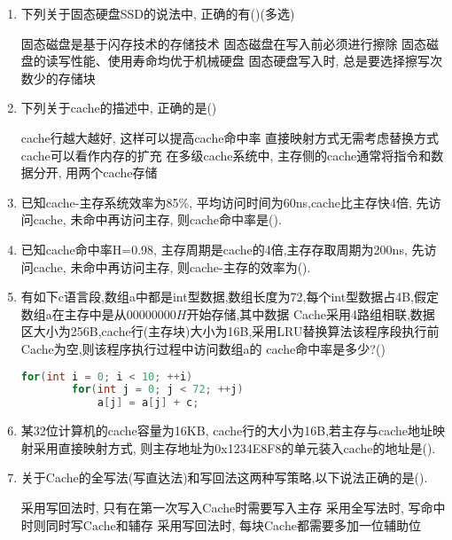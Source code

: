 \documentclass[12pt, a4paper, oneside, UTF8]{ctexbook}
\begin{document}
\begin{enumerate}
    \item 下列关于固态硬盘SSD的说法中, 正确的有(\qquad)(多选)
    \begin{choices}[1]
        \task 固态磁盘是基于闪存技术的存储技术
        \task 固态磁盘在写入前必须进行擦除
        \task 固态磁盘的读写性能、使用寿命均优于机械硬盘
        \task 固态硬盘写入时, 总是要选择擦写次数少的存储块
    \end{choices}

    \item 下列关于cache的描述中, 正确的是(\qquad)
    \begin{choices}[1]
        \task cache行越大越好, 这样可以提高cache命中率
        \task 直接映射方式无需考虑替换方式
        \task cache可以看作内存的扩充
        \task 在多级cache系统中, 主存侧的cache通常将指令和数据分开, 用两个cache存储
    \end{choices}

    \item 已知cache-主存系统效率为85\%, 平均访问时间为60ns,cache比主存快4倍, 先访问cache, 未命中再访问主存,
    则cache命中率是(\qquad).

    \item 已知cache命中率H=0.98, 主存周期是cache的4倍,主存存取周期为200ns, 先访问cache, 未命中再访问主存,
    则cache-主存的效率为(\qquad).

    \item 有如下c语言段,数组a中都是int型数据,数组长度为72,每个int型数据占4B,假定数组a在主存中是从$00000000H$开始存储,其中数据
    Cache采用4路组相联,数据区大小为256B,cache行(主存块)大小为16B,采用LRU替换算法该程序段执行前Cache为空,则该程序执行过程中访问数组a的
    cache命中率是多少?(\qquad)
    \begin{lstlisting}[language=C]
    for(int i = 0; i < 10; ++i)
        for(int j = 0; j < 72; ++j)
            a[j] = a[j] + c;
    \end{lstlisting}

    \item 某32位计算机的cache容量为16KB, cache行的大小为16B,若主存与cache地址映射采用直接映射方式,
    则主存地址为0x1234E8F8的单元装入cache的地址是(\qquad).

    \item 关于Cache的全写法(写直达法)和写回法这两种写策略,以下说法正确的是(\qquad).
    \begin{choices}[1]
        \task 采用写回法时, 只有在第一次写入Cache时需要写入主存
        \task 采用全写法时, 写命中时则同时写Cache和辅存
        \task 采用写回法时, 每块Cache都需要多加一位辅助位
    \end{choices}


\end{enumerate}
\end{document}
